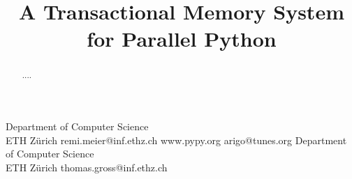 \documentclass{sigplanconf}
\newcommand{\comment}[1]{}
\begin{document}
\setlength{\pdfpageheight}{\paperheight}
\setlength{\pdfpagewidth}{\paperwidth}






\title{A Transactional Memory System for Parallel Python}

\comment{
A Platform for Parallelism in Dynamic languages
Parallelism for Python
A TM Implementation for Python
Transactional Memory as a foundation for parallel Python
Transactional Memory as a foundation for parallelism in Python
Parallel Python based on VM-assisted TM
Parallel Python based on VM-assisted Transactional Memory
A Platform for parallel Python
A TM Platform for parallel Python
A Transactional Memory Platform for parallel Python
A Transactional Memory system for parallel Python

Virtual Memory Assisted Transactional Memory for Dynamic Languages}

           {Department of Computer Science\\ ETH Zürich}
           {remi.meier@inf.ethz.ch}
           {www.pypy.org}
           {arigo@tunes.org}
           {Department of Computer Science\\ ETH Zürich}
           {thomas.gross@inf.ethz.ch}

\maketitle

\begin{abstract}
....
\end{abstract}
\end{document}
